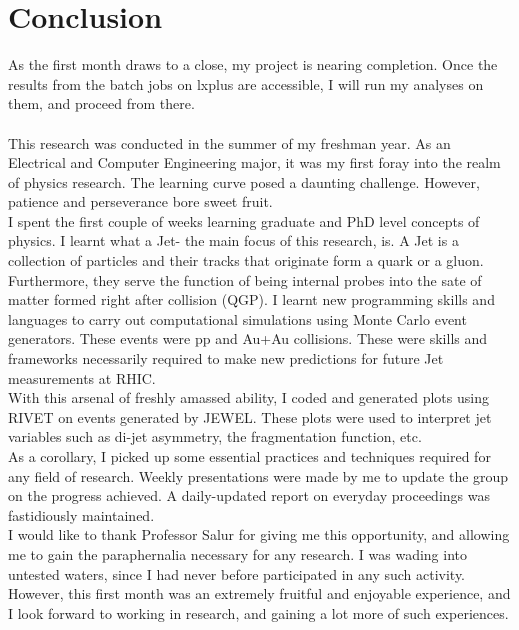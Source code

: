 \documentclass{article}
\begin{document}
\begin{figure}[H]
\centering
{} 
\end{figure}

\section{Conclusion}
As the first month draws to a close, my project is nearing completion. Once the results from the batch jobs on lxplus are accessible, I will run my analyses on them, and proceed from there.\\\\
This research was conducted in the summer of my freshman year. As an Electrical and Computer Engineering major, it was my first foray into the realm of physics research. The learning curve posed a daunting challenge. However, patience and perseverance bore sweet fruit.\\
   I spent the first couple of weeks learning graduate and PhD level concepts of physics. I learnt what a Jet- the main focus of this research, is. A Jet is a collection of particles and their tracks that originate form a quark or a gluon. Furthermore, they serve the function of being internal probes into the sate of matter formed right after collision (QGP). I learnt new programming skills and languages to carry out computational simulations using Monte Carlo event generators. These events were pp and Au+Au collisions. These were skills and frameworks necessarily required to make new predictions for future Jet measurements at RHIC.\\
   With this arsenal of freshly amassed ability, I coded and generated plots using RIVET on events generated by JEWEL. These plots were used to interpret jet variables such as di-jet asymmetry, the fragmentation function, etc.\\
   As a corollary, I picked up some essential practices and techniques required for any field of research. Weekly presentations were made by me to update the group on the progress achieved. A daily-updated report on everyday proceedings was fastidiously maintained.
\\
I would like to thank Professor Salur for giving me this opportunity, and allowing me to gain the paraphernalia necessary for any research. I was wading into untested waters, since I had never before participated in any such activity. However, this first month was an extremely fruitful and enjoyable experience, and I look forward to working in research, and gaining a lot more of such experiences.
\end{document}
